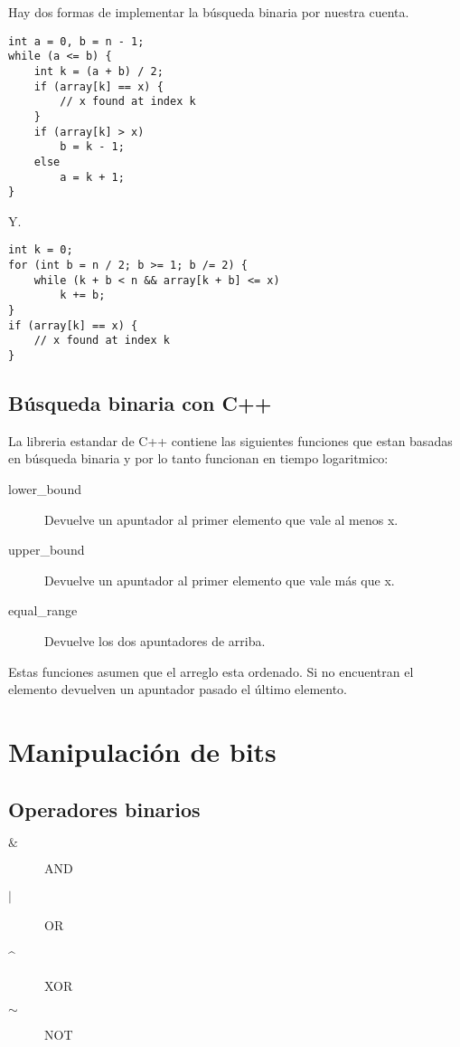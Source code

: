 \documentclass[11pt]{article}
\begin{document}
Hay dos formas de implementar la búsqueda binaria por nuestra cuenta.

\begin{lstlisting}
int a = 0, b = n - 1;
while (a <= b) {
    int k = (a + b) / 2;
    if (array[k] == x) {
        // x found at index k
    }
    if (array[k] > x)
        b = k - 1;
    else
        a = k + 1;
}
\end{lstlisting}

Y.

\begin{lstlisting}
int k = 0;
for (int b = n / 2; b >= 1; b /= 2) {
    while (k + b < n && array[k + b] <= x)
        k += b;
}
if (array[k] == x) {
    // x found at index k
}
\end{lstlisting}

\subsection{Búsqueda binaria con C++}

La libreria estandar de C++ contiene las siguientes funciones que estan basadas en búsqueda binaria y por lo tanto funcionan en tiempo logaritmico:

\begin{description}
    \item[lower\_bound] Devuelve un apuntador al primer elemento que vale al menos x.
    \item[upper\_bound] Devuelve un apuntador al primer elemento que vale más que x.
    \item[equal\_range] Devuelve los dos apuntadores de arriba.
\end{description}

Estas funciones asumen que el arreglo esta ordenado. Si no encuentran el
elemento devuelven un apuntador pasado el último elemento.

\section{Manipulación de bits}

\subsection{Operadores binarios}

\begin{description}
    \item[$ \& $] AND
    \item[$ | $] OR
    \item[\^{}] XOR
    \item[$ \sim $] NOT
\end{description}
\end{document}
